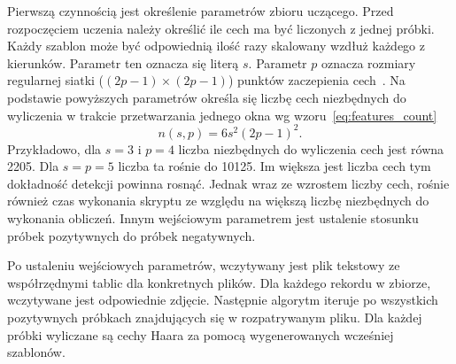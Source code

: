\FloatBarrier
Pierwszą czynnością jest określenie parametrów zbioru uczącego.
Przed rozpoczęciem uczenia należy określić ile cech ma być liczonych z jednej próbki.
Każdy szablon może być odpowiednią ilość razy skalowany wzdłuż każdego z kierunków.
Parametr ten oznacza się literą $s$.
Parametr $p$ oznacza rozmiary regularnej siatki ($(2p-1)\times (2p-1)$) punktów zaczepienia cech~\cite{szybka_detekcja_klesk}.
Na podstawie powyższych parametrów określa się liczbę cech niezbędnych do wyliczenia w trakcie przetwarzania jednego okna wg wzoru~\eqref{eq:features_count}
\begin{equation}
    \label{eq:features_count}
    n(s,p)=6s^2(2p-1)^2.
\end{equation}
Przykładowo, dla $s=3$ i $p=4$ liczba niezbędnych do wyliczenia cech jest równa 2205.
Dla $s=p=5$ liczba ta rośnie do 10125.
Im większa jest liczba cech tym dokładność detekcji powinna rosnąć.
Jednak wraz ze wzrostem liczby cech, rośnie również czas wykonania skryptu ze względu na większą liczbę niezbędnych do wykonania obliczeń.
Innym wejściowym parametrem jest ustalenie stosunku próbek pozytywnych do próbek negatywnych.

Po ustaleniu wejściowych parametrów, wczytywany jest plik tekstowy ze współrzędnymi tablic dla konkretnych plików.
Dla każdego rekordu w zbiorze, wczytywane jest odpowiednie zdjęcie.
Następnie algorytm iteruje po wszystkich pozytywnych próbkach znajdujących się w rozpatrywanym pliku.
Dla każdej próbki wyliczane są cechy Haara za pomocą wygenerowanych wcześniej szablonów.

